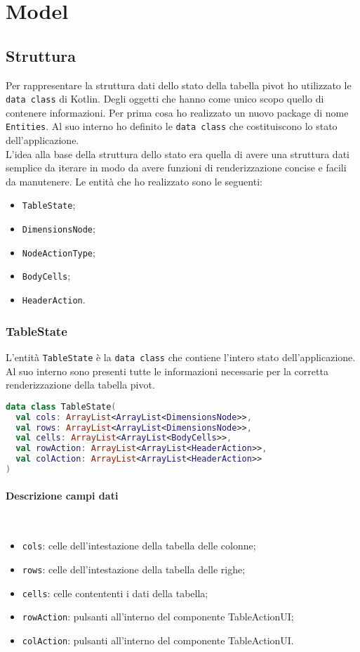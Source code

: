 \section{Model}
\subsection{Struttura}
Per rappresentare la struttura dati dello stato della tabella pivot ho utilizzato le \verb|data class| di Kotlin. Degli oggetti che hanno come unico scopo quello di contenere informazioni. Per prima cosa ho realizzato un nuovo package di nome \verb|Entities|. Al suo interno ho definito le \verb|data class| che costituiscono lo stato dell'applicazione. \\
L'idea alla base della struttura dello stato era quella di avere una struttura dati semplice da iterare in modo da avere funzioni di renderizzazione concise e facili da manutenere. Le entità che ho realizzato sono le seguenti:
\begin{itemize}
	\item \verb|TableState|;
	\item \verb|DimensionsNode|;
	\item \verb|NodeActionType|;
	\item \verb|BodyCells|;
	\item \verb|HeaderAction|.
\end{itemize}

\subsubsection{TableState}
L'entità \verb|TableState| è la \verb|data class| che contiene l'intero stato dell'applicazione. Al suo interno sono presenti tutte le informazioni necessarie per la corretta renderizzazione della tabella pivot.
\begin{lstlisting}[caption={TableState}, label={lst:tablestate}, language=Kotlin]
data class TableState(
  val cols: ArrayList<ArrayList<DimensionsNode>>,
  val rows: ArrayList<ArrayList<DimensionsNode>>,
  val cells: ArrayList<ArrayList<BodyCells>>,
  val rowAction: ArrayList<ArrayList<HeaderAction>>,
  val colAction: ArrayList<ArrayList<HeaderAction>>
)
\end{lstlisting}

\paragraph{Descrizione campi dati} \mbox{} \\
\begin{itemize}
	\item \verb|cols|: celle dell'intestazione della tabella delle colonne;
	\item \verb|rows|: celle dell'intestazione della tabella delle righe;
	\item \verb|cells|: celle contententi i dati della tabella;
	\item \verb|rowAction|: pulsanti all'interno del componente TableActionUI;
	\item \verb|colAction|: pulsanti all'interno del componente TableActionUI.
\end{itemize}

